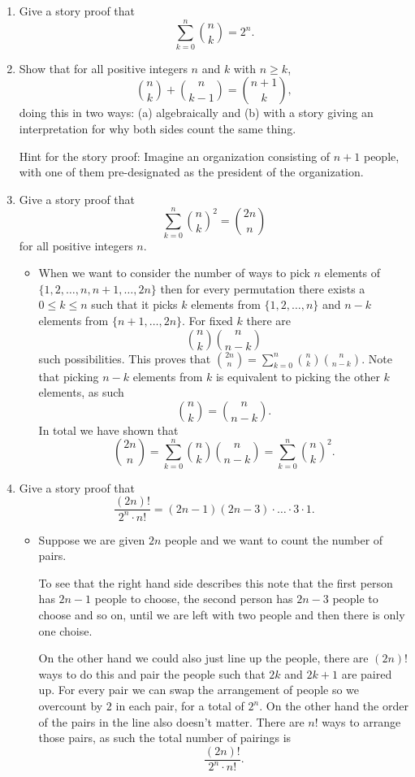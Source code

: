 \documentclass{article}
\begin{document}
\begin{enumerate}
	\item Give a story proof that
	$$
	\sum_{k = 0}^n \binom{n}{k} = 2^n.
	$$
	\item Show that for all positive integers $n$ and $k$ with $n \geq k$,
	$$
	\binom{n}{k} + \binom{n}{k - 1} = \binom{n + 1}{k},
	$$
	doing this in two ways: (a) algebraically and (b) with a story giving an interpretation for why both sides count the same thing.

	Hint for the story proof: Imagine an organization consisting of $n + 1$ people, with one of them pre-designated as the president of the organization.
	\item Give a story proof that
	$$
	\sum_{k = 0}^n \binom{n}{k}^2 = \binom{2n}{n}
	$$
	for all positive integers $n$.
		\begin{itemize}
			\item When we want to consider the number of ways to pick $n$ elements of $\{1, 2, \dots, n, n + 1, \dots, 2n\}$ then for every permutation there exists a $0 \leq k \leq n$ such that it picks $k$ elements from $\{1, 2, \dots, n\}$ and $n - k$ elements from $\{n + 1, \dots, 2n\}$. For fixed $k$ there are
			$$
			\binom{n}{k} \binom{n}{n - k}
			$$
			such possibilities. This proves that $\binom{2n}{n} = \sum_{k = 0}^n \binom{n}{k} \binom{n}{n - k}$. Note that picking $n - k$ elements from $k$ is equivalent to picking the other $k$ elements, as such
			$$
			\binom{n}{k} = \binom{n}{n - k}.
			$$
			In total we have shown that
			$$
			\binom{2n}{n} = \sum_{k = 0}^n \binom{n}{k} \binom{n}{n - k} = \sum_{k = 0}^n \binom{n}{k}^2.
			$$
		\end{itemize}
	\item Give a story proof that
	$$
	\frac{(2n)!}{2^n \cdot n!} = (2n - 1) (2n - 3) \cdot \dots \cdot 3 \cdot 1.
	$$
		\begin{itemize}
			\item Suppose we are given $2n$ people and we want to count the number of pairs.

			To see that the right hand side describes this note that the first person has $2n - 1$ people to choose, the second person has $2n - 3$ people to choose and so on, until we are left with two people and then there is only one choise.

			On the other hand we could also just line up the people, there are $(2n)!$ ways to do this and pair the people such that $2k$ and $2k + 1$ are paired up. For every pair we can swap the arrangement of people so we overcount by $2$ in each pair, for a total of $2^n$. On the other hand the order of the pairs in the line also doesn't matter. There are $n!$ ways to arrange those pairs, as such the total number of pairings is
			$$
			\frac{(2n)!}{2^n \cdot n!}.
			$$
		\end{itemize}
\end{enumerate}
\end{document}

